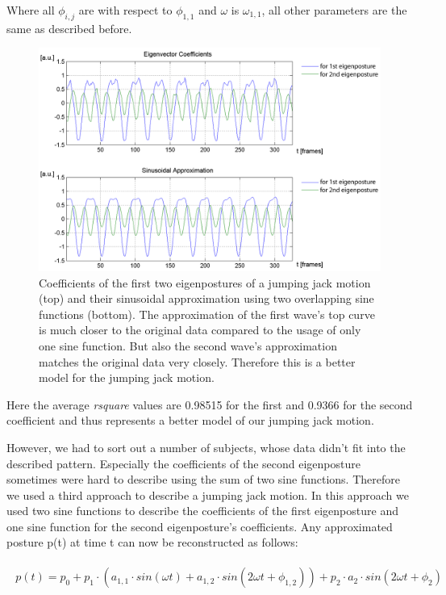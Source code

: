 \documentclass[a4paper]{article}
\begin{document}
Where all $\phi_{i,j}$ are with respect to $\phi_{1,1}$ and $\omega$ is $\omega_{1,1}$, all other parameters are the same as described before.

\begin{figure}
		\centering
		\includegraphics[width=\textwidth]{2sinHamp.png}
		\caption{Coefficients of the first two eigenpostures of a jumping jack motion (top) and their sinusoidal approximation using two overlapping sine functions (bottom).
		The approximation of the first wave's top curve is much closer to the original data compared to the usage of only one sine function.
		But also the second wave's approximation matches the original data very closely.
		Therefore this is a better model for the jumping jack motion.}
		\label{fig:approx2}
\end{figure}

Here the average \emph{rsquare} values are 0.98515 for the first and 0.9366 for the second coefficient and thus represents a better model of our jumping jack motion.

However, we had to sort out a number of subjects, whose data didn't fit into the described pattern.
Especially the coefficients of the second eigenposture sometimes were hard to describe using the sum of two sine functions. Therefore we used a third approach to describe a jumping jack motion.
In this approach we used two sine functions to describe the coefficients of the first eigenposture and one sine function for the second eigenposture's coefficients.
Any approximated posture p(t) at time t can now be reconstructed as follows:

\begin{align}
	\begin{aligned}
		p(t) = p_{0} + p_{1} \cdot (a_{1,1} \cdot sin(\omega t) + a_{1,2} \cdot sin(2 \omega t + \phi_{1,2}))
		 + p_{2} \cdot a_{2} \cdot sin(2 \omega t + \phi_{2})
	\end{aligned}
	\label{eq:approxPostureSin2_1}
\end{align}
\end{document}
